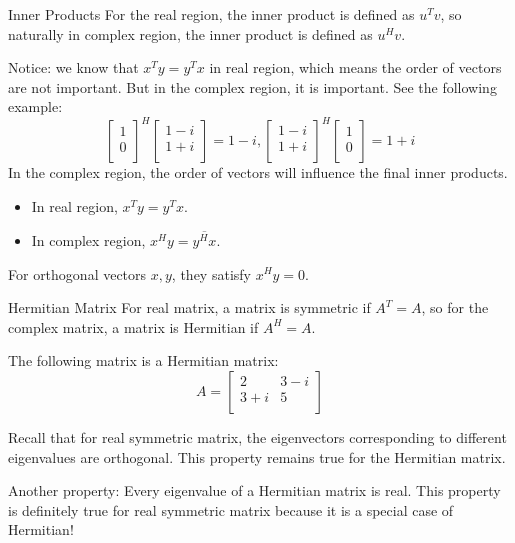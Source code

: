 \documentclass{beamer}
\begin{document}
\begin{frame}{Inner Products}
For the real region, the inner product is defined as $u^Tv$, so naturally in complex region, the inner product is defined as $u^Hv$.

\vspace{3pt}
Notice: we know that $x^Ty=y^Tx$ in real region, which means the order of vectors are not important. But in the complex region, it is important.
See the following example:
\begin{equation*}
    \left[ \begin{array}{c}
        1\\
        0\\
    \end{array} \right] ^H\left[ \begin{array}{c}
        1-i\\
        1+i\\
    \end{array} \right] =1-i, \left[ \begin{array}{c}
        1-i\\
        1+i\\
    \end{array} \right] ^H\left[ \begin{array}{c}
        1\\
        0\\
    \end{array} \right] =1+i
\end{equation*}
In the complex region, the order of vectors will influence the final inner products.
\begin{itemize}
    \item In real region, $x^Ty=y^Tx$.
    \item In complex region, $x^Hy=\overline{y^Hx}$.
\end{itemize}
For orthogonal vectors $x, y$, they satisfy $x^Hy=0$.
\end{frame}

\begin{frame}{Hermitian Matrix}
For real matrix, a matrix is symmetric if $A^T=A$, so for the complex matrix, a matrix is Hermitian if $A^H=A$.

\vspace{3pt}
The following matrix is a Hermitian matrix:
\begin{equation*}
    A=\left[ \begin{matrix}
        2&		3-i\\
        3+i&		5\\
    \end{matrix} \right]
\end{equation*}

Recall that for real symmetric matrix, the eigenvectors corresponding to different eigenvalues are orthogonal. This property remains true for the Hermitian matrix.

\vspace{3pt}
Another property: Every eigenvalue of a Hermitian matrix is real. This property is definitely true for real symmetric matrix because it is a special case of Hermitian!
\end{frame}
\end{document}

